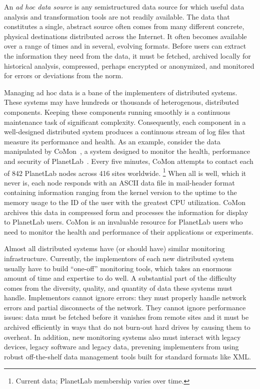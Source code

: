 

An {\em ad hoc data source} is any semistructured data source for
which useful data analysis and transformation tools are not readily
available.  The data that constitutes a single, abstract source 
often comes from many different concrete, physical destinations
distributed across the Internet.  It often becomes available
over a range of times and in several, evolving formats.
Before users can extract the information they need from the data,
it must be fetched, archived locally for historical analysis, 
compressed, perhaps encrypted or anonymized, and monitored for errors 
or deviations from the norm.

Managing ad hoc data is a bane of the implementers of distributed
systems.  These systems may have hundreds or thousands of
heterogenous, distributed components.  Keeping these components
running smoothly is a continuous maintenance task of significant
complexity.  Consequently, each component in a well-designed
distributed system produces a continuous stream of log files that
measure its performance and health.  As an example, consider the data
manipulated by CoMon~\cite{comon}, a system designed to monitor the
health, performance and security of PlanetLab~\cite{planetlab}.  Every
five minutes, CoMon attempts to contact each of 842 PlanetLab nodes
across 416 sites worldwide.%
\footnote{Current data; PlanetLab membership varies over time.} %
% 
When all is well, which it never is, each node responds with
an ASCII data file in mail-header format containing information
ranging from the kernel version to the uptime to the memory usage to
the ID of the user with the greatest CPU utilization.  CoMon archives
this data in compressed form and processes the information
for display to PlanetLab users.  CoMon is an invaluable resource for
PlanetLab users who need to monitor the health and performance of their
applications or experiments.

Almost all distributed systems have (or should have) similar
monitoring infrastructure.  Currently, the implementors of each new
distributed system usually have to build ``one-off'' monitoring tools,
which takes an enormous amount of time and expertise to do well.  A
substantial part of the difficulty comes from the diversity, quality,
and quantity of data these systems must handle.  Implementors cannot
ignore errors: they must properly handle network errors and partial
disconnects of the network.  They cannot ignore performance issues:
data must be fetched before it vanishes from remote sites and it must
be archived efficiently in ways that do not burn-out hard drives by
causing them to overheat.  In addition, new monitoring systems also
must interact with legacy devices, legacy software and legacy data,
prevening implementers from using robust off-the-shelf data management
tools built for standard formats like XML. 

